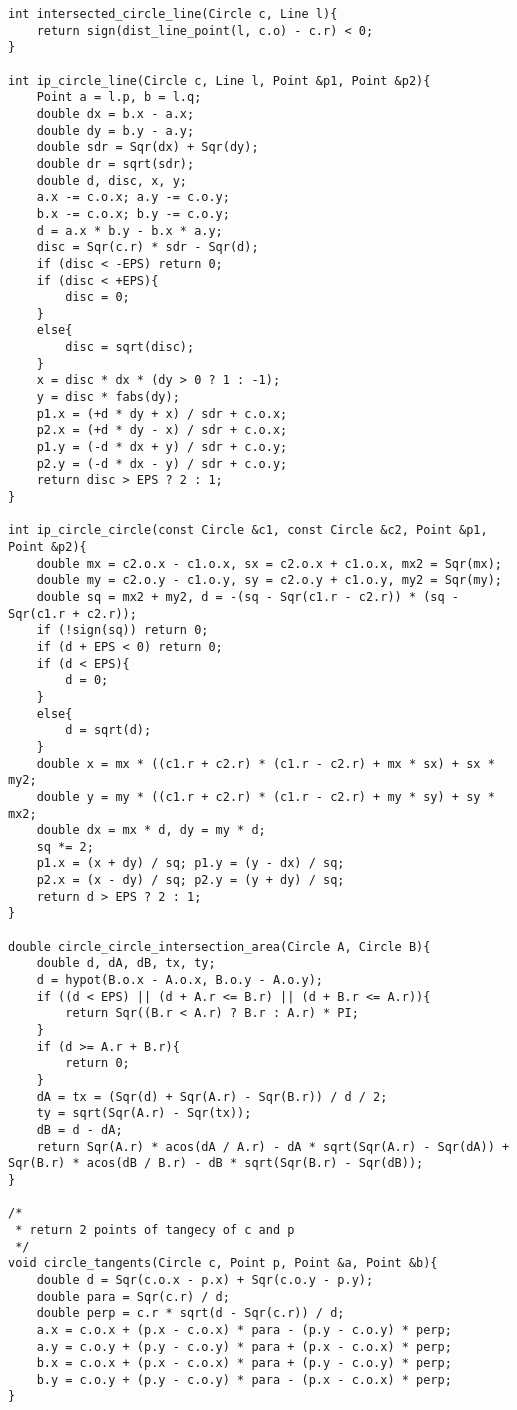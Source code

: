 \begin{verbatim}
int intersected_circle_line(Circle c, Line l){
    return sign(dist_line_point(l, c.o) - c.r) < 0;
}

int ip_circle_line(Circle c, Line l, Point &p1, Point &p2){
    Point a = l.p, b = l.q;
    double dx = b.x - a.x;
    double dy = b.y - a.y;
    double sdr = Sqr(dx) + Sqr(dy);
    double dr = sqrt(sdr);
    double d, disc, x, y;
    a.x -= c.o.x; a.y -= c.o.y;
    b.x -= c.o.x; b.y -= c.o.y;
    d = a.x * b.y - b.x * a.y;
    disc = Sqr(c.r) * sdr - Sqr(d);
    if (disc < -EPS) return 0;
    if (disc < +EPS){
        disc = 0;
    }
    else{
        disc = sqrt(disc);
    }
    x = disc * dx * (dy > 0 ? 1 : -1);
    y = disc * fabs(dy);
    p1.x = (+d * dy + x) / sdr + c.o.x;
    p2.x = (+d * dy - x) / sdr + c.o.x;
    p1.y = (-d * dx + y) / sdr + c.o.y;
    p2.y = (-d * dx - y) / sdr + c.o.y;
    return disc > EPS ? 2 : 1;
}

int ip_circle_circle(const Circle &c1, const Circle &c2, Point &p1, Point &p2){
    double mx = c2.o.x - c1.o.x, sx = c2.o.x + c1.o.x, mx2 = Sqr(mx);
    double my = c2.o.y - c1.o.y, sy = c2.o.y + c1.o.y, my2 = Sqr(my);
    double sq = mx2 + my2, d = -(sq - Sqr(c1.r - c2.r)) * (sq - Sqr(c1.r + c2.r));
    if (!sign(sq)) return 0;
    if (d + EPS < 0) return 0;
    if (d < EPS){
        d = 0;
    }
    else{
        d = sqrt(d);
    }
    double x = mx * ((c1.r + c2.r) * (c1.r - c2.r) + mx * sx) + sx * my2;
    double y = my * ((c1.r + c2.r) * (c1.r - c2.r) + my * sy) + sy * mx2;
    double dx = mx * d, dy = my * d;
    sq *= 2;
    p1.x = (x + dy) / sq; p1.y = (y - dx) / sq;
    p2.x = (x - dy) / sq; p2.y = (y + dy) / sq;
    return d > EPS ? 2 : 1; 
}

double circle_circle_intersection_area(Circle A, Circle B){
    double d, dA, dB, tx, ty;
    d = hypot(B.o.x - A.o.x, B.o.y - A.o.y);
    if ((d < EPS) || (d + A.r <= B.r) || (d + B.r <= A.r)){
        return Sqr((B.r < A.r) ? B.r : A.r) * PI;
    }
    if (d >= A.r + B.r){
        return 0;
    }
    dA = tx = (Sqr(d) + Sqr(A.r) - Sqr(B.r)) / d / 2;
    ty = sqrt(Sqr(A.r) - Sqr(tx));
    dB = d - dA;
    return Sqr(A.r) * acos(dA / A.r) - dA * sqrt(Sqr(A.r) - Sqr(dA)) + Sqr(B.r) * acos(dB / B.r) - dB * sqrt(Sqr(B.r) - Sqr(dB));
}

/*
 * return 2 points of tangecy of c and p
 */
void circle_tangents(Circle c, Point p, Point &a, Point &b){
    double d = Sqr(c.o.x - p.x) + Sqr(c.o.y - p.y);
    double para = Sqr(c.r) / d;
    double perp = c.r * sqrt(d - Sqr(c.r)) / d;
    a.x = c.o.x + (p.x - c.o.x) * para - (p.y - c.o.y) * perp;
    a.y = c.o.y + (p.y - c.o.y) * para + (p.x - c.o.x) * perp;
    b.x = c.o.x + (p.x - c.o.x) * para + (p.y - c.o.y) * perp;
    b.y = c.o.y + (p.y - c.o.y) * para - (p.x - c.o.x) * perp;
}


\end{verbatim}
